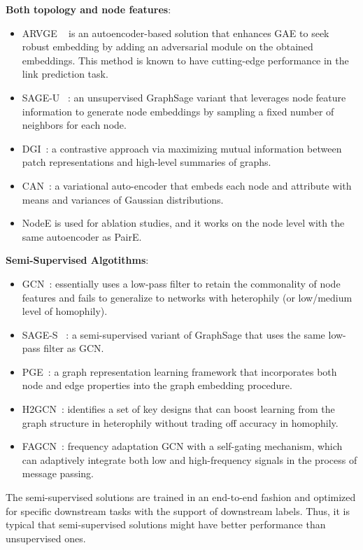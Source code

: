 \documentclass[10pt,journal,compsoc]{IEEEtran}
\begin{document}
\noindent  \textbf{Both topology and node features}:
\begin{itemize}
  \item {ARVGE} ~\cite{ARGA18} is an autoencoder-based solution that enhances GAE to seek robust embedding by adding an adversarial module on the obtained embeddings. This method is known to have cutting-edge performance in the link prediction task.
  \item {SAGE-U} ~\cite{hamilton_grapshsage}: an unsupervised GraphSage variant that leverages node feature information to generate node embeddings by sampling a fixed number of neighbors for each node. 
  \item {DGI}~\cite{Veli18_dgi}: a contrastive approach via maximizing mutual information between patch representations and high-level summaries of graphs.
  \item {CAN}~\cite{meng2019co}: a variational auto-encoder that embeds each node and attribute with means and variances of Gaussian distributions.
  \item  NodeE is used for ablation studies, and it works on the node level with the same autoencoder as PairE.

\end{itemize}
\noindent \textbf{Semi-Supervised Algotithms}:
\begin{itemize}
\item{GCN}~\cite{Kipf16}: essentially uses a low-pass filter to retain the commonality of node features and fails to generalize to networks with heterophily (or low/medium level of homophily).
\item{SAGE-S} ~\cite{hamilton_grapshsage}: a semi-supervised variant of GraphSage that uses the same low-pass filter as GCN.
\item{PGE}~\cite{hou2019representation}: a graph representation learning framework that incorporates both node and edge
properties into the graph embedding procedure.
\item{H2GCN}~\cite{Zhu2020}: identifies a set of key designs that can boost learning from the graph structure in heterophily without trading off accuracy in homophily.
\item{FAGCN}~\cite{Zhu21}: frequency adaptation GCN with a self-gating mechanism, which can adaptively integrate both low and high-frequency signals in the process of message passing.
\end{itemize}

The semi-supervised solutions are trained in an end-to-end fashion and optimized for specific downstream tasks with the support of downstream labels. Thus, it is typical that semi-supervised solutions might have better performance than unsupervised ones.  
\end{document}
